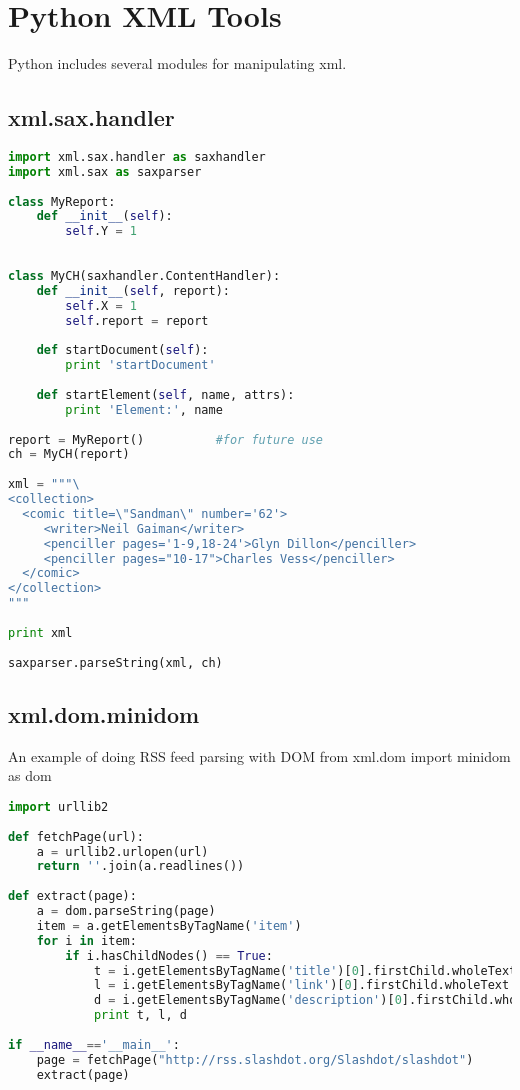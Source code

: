 \section{Python XML Tools}
Python includes several modules for manipulating xml.

\subsection{xml.sax.handler}
\lstset{basicstyle=\scriptsize, numbers=left, captionpos=b, tabsize=4}
\begin{lstlisting}[caption=sax,language={Python},
xleftmargin=15pt, label=lst:sax]
import xml.sax.handler as saxhandler
import xml.sax as saxparser
 
class MyReport:
    def __init__(self):
        self.Y = 1
 
 
class MyCH(saxhandler.ContentHandler):
    def __init__(self, report):
        self.X = 1
        self.report = report
 
    def startDocument(self):
        print 'startDocument'
 
    def startElement(self, name, attrs):
        print 'Element:', name
 
report = MyReport()          #for future use
ch = MyCH(report)
 
xml = """\
<collection>
  <comic title=\"Sandman\" number='62'>
     <writer>Neil Gaiman</writer>
     <penciller pages='1-9,18-24'>Glyn Dillon</penciller>
     <penciller pages="10-17">Charles Vess</penciller>
  </comic>
</collection>
"""
 
print xml
 
saxparser.parseString(xml, ch)
\end{lstlisting}

\subsection{xml.dom.minidom}
An example of doing RSS feed parsing with DOM from xml.dom import minidom as dom
\lstset{basicstyle=\scriptsize, numbers=left, captionpos=b, tabsize=4}
\begin{lstlisting}[caption=minidom,language={Python},
xleftmargin=15pt, label=lst:minidom]
import urllib2
 
def fetchPage(url):
    a = urllib2.urlopen(url)
    return ''.join(a.readlines())
 
def extract(page):
    a = dom.parseString(page)
    item = a.getElementsByTagName('item')
    for i in item:
        if i.hasChildNodes() == True:
            t = i.getElementsByTagName('title')[0].firstChild.wholeText
            l = i.getElementsByTagName('link')[0].firstChild.wholeText
            d = i.getElementsByTagName('description')[0].firstChild.wholeText
            print t, l, d
 
if __name__=='__main__':
    page = fetchPage("http://rss.slashdot.org/Slashdot/slashdot")
    extract(page)
\end{lstlisting}
